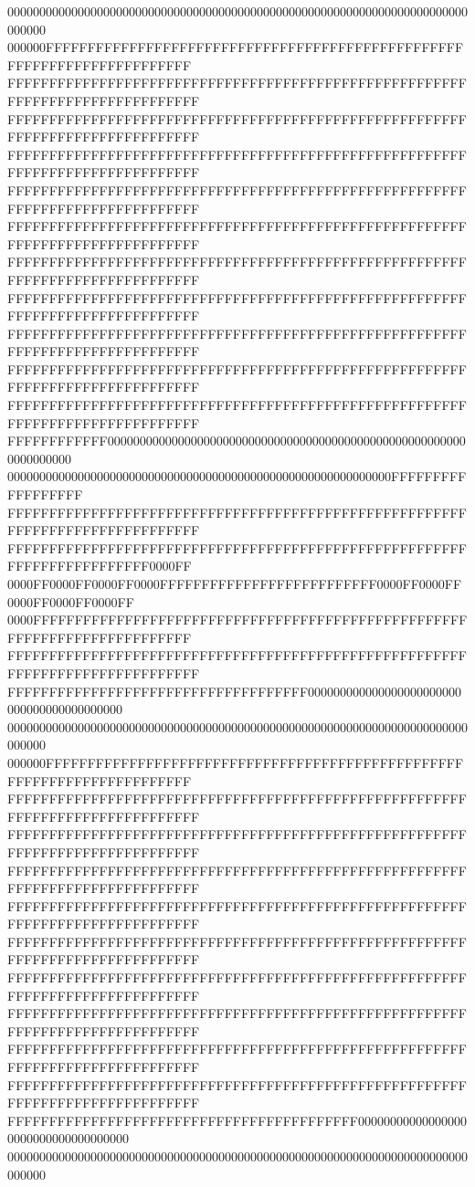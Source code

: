 000000000000000000000000000000000000000000000000000000000000000000000000000000
000000FFFFFFFFFFFFFFFFFFFFFFFFFFFFFFFFFFFFFFFFFFFFFFFFFFFFFFFFFFFFFFFFFFFFFFFF
FFFFFFFFFFFFFFFFFFFFFFFFFFFFFFFFFFFFFFFFFFFFFFFFFFFFFFFFFFFFFFFFFFFFFFFFFFFFFF
FFFFFFFFFFFFFFFFFFFFFFFFFFFFFFFFFFFFFFFFFFFFFFFFFFFFFFFFFFFFFFFFFFFFFFFFFFFFFF
FFFFFFFFFFFFFFFFFFFFFFFFFFFFFFFFFFFFFFFFFFFFFFFFFFFFFFFFFFFFFFFFFFFFFFFFFFFFFF
FFFFFFFFFFFFFFFFFFFFFFFFFFFFFFFFFFFFFFFFFFFFFFFFFFFFFFFFFFFFFFFFFFFFFFFFFFFFFF
FFFFFFFFFFFFFFFFFFFFFFFFFFFFFFFFFFFFFFFFFFFFFFFFFFFFFFFFFFFFFFFFFFFFFFFFFFFFFF
FFFFFFFFFFFFFFFFFFFFFFFFFFFFFFFFFFFFFFFFFFFFFFFFFFFFFFFFFFFFFFFFFFFFFFFFFFFFFF
FFFFFFFFFFFFFFFFFFFFFFFFFFFFFFFFFFFFFFFFFFFFFFFFFFFFFFFFFFFFFFFFFFFFFFFFFFFFFF
FFFFFFFFFFFFFFFFFFFFFFFFFFFFFFFFFFFFFFFFFFFFFFFFFFFFFFFFFFFFFFFFFFFFFFFFFFFFFF
FFFFFFFFFFFFFFFFFFFFFFFFFFFFFFFFFFFFFFFFFFFFFFFFFFFFFFFFFFFFFFFFFFFFFFFFFFFFFF
FFFFFFFFFFFFFFFFFFFFFFFFFFFFFFFFFFFFFFFFFFFFFFFFFFFFFFFFFFFFFFFFFFFFFFFFFFFFFF
FFFFFFFFFFFF000000000000000000000000000000000000000000000000000000000000000000
000000000000000000000000000000000000000000000000000000000000FFFFFFFFFFFFFFFFFF
FFFFFFFFFFFFFFFFFFFFFFFFFFFFFFFFFFFFFFFFFFFFFFFFFFFFFFFFFFFFFFFFFFFFFFFFFFFFFF
FFFFFFFFFFFFFFFFFFFFFFFFFFFFFFFFFFFFFFFFFFFFFFFFFFFFFFFFFFFFFFFFFFFFFFFF0000FF
0000FF0000FF0000FF0000FFFFFFFFFFFFFFFFFFFFFFFFFF0000FF0000FF0000FF0000FF0000FF
0000FFFFFFFFFFFFFFFFFFFFFFFFFFFFFFFFFFFFFFFFFFFFFFFFFFFFFFFFFFFFFFFFFFFFFFFFFF
FFFFFFFFFFFFFFFFFFFFFFFFFFFFFFFFFFFFFFFFFFFFFFFFFFFFFFFFFFFFFFFFFFFFFFFFFFFFFF
FFFFFFFFFFFFFFFFFFFFFFFFFFFFFFFFFFFF000000000000000000000000000000000000000000
000000000000000000000000000000000000000000000000000000000000000000000000000000
000000FFFFFFFFFFFFFFFFFFFFFFFFFFFFFFFFFFFFFFFFFFFFFFFFFFFFFFFFFFFFFFFFFFFFFFFF
FFFFFFFFFFFFFFFFFFFFFFFFFFFFFFFFFFFFFFFFFFFFFFFFFFFFFFFFFFFFFFFFFFFFFFFFFFFFFF
FFFFFFFFFFFFFFFFFFFFFFFFFFFFFFFFFFFFFFFFFFFFFFFFFFFFFFFFFFFFFFFFFFFFFFFFFFFFFF
FFFFFFFFFFFFFFFFFFFFFFFFFFFFFFFFFFFFFFFFFFFFFFFFFFFFFFFFFFFFFFFFFFFFFFFFFFFFFF
FFFFFFFFFFFFFFFFFFFFFFFFFFFFFFFFFFFFFFFFFFFFFFFFFFFFFFFFFFFFFFFFFFFFFFFFFFFFFF
FFFFFFFFFFFFFFFFFFFFFFFFFFFFFFFFFFFFFFFFFFFFFFFFFFFFFFFFFFFFFFFFFFFFFFFFFFFFFF
FFFFFFFFFFFFFFFFFFFFFFFFFFFFFFFFFFFFFFFFFFFFFFFFFFFFFFFFFFFFFFFFFFFFFFFFFFFFFF
FFFFFFFFFFFFFFFFFFFFFFFFFFFFFFFFFFFFFFFFFFFFFFFFFFFFFFFFFFFFFFFFFFFFFFFFFFFFFF
FFFFFFFFFFFFFFFFFFFFFFFFFFFFFFFFFFFFFFFFFFFFFFFFFFFFFFFFFFFFFFFFFFFFFFFFFFFFFF
FFFFFFFFFFFFFFFFFFFFFFFFFFFFFFFFFFFFFFFFFFFFFFFFFFFFFFFFFFFFFFFFFFFFFFFFFFFFFF
FFFFFFFFFFFFFFFFFFFFFFFFFFFFFFFFFFFFFFFFFF000000000000000000000000000000000000
000000000000000000000000000000000000000000000000000000000000000000000000000000

